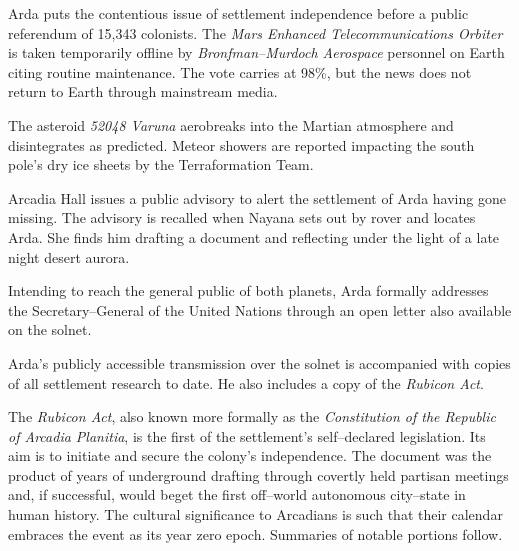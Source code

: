 Arda puts the contentious issue of settlement independence before a public referendum of 15,343 colonists. The {\it Mars Enhanced Telecommunications Orbiter} is taken temporarily offline by {\it Bronfman--Murdoch Aerospace} personnel on Earth citing routine maintenance. The vote carries at 98\%, but the news does not return to Earth through mainstream media.
\StopTimelineDate

The asteroid {\it 52048 Varuna} aerobreaks into the Martian atmosphere and disintegrates as predicted. Meteor showers are reported impacting the south pole's dry ice sheets by the Terraformation Team.
\StopTimelineDate

Arcadia Hall issues a public advisory to alert the settlement of Arda having gone missing. The advisory is recalled when Nayana sets out by rover and locates Arda. She finds him drafting a document and reflecting under the light of a late night desert aurora.
\StopTimelineDate


Intending to reach the general public of both planets, Arda formally addresses the Secretary--General of the United Nations through an open letter also available on the solnet.

\startTimelineCorrespondenceDocument
    
\stopTimelineCorrespondenceDocument

Arda's publicly accessible transmission over the solnet is accompanied with copies of all settlement research to date. He also includes a copy of the {\it Rubicon Act}. 

The {\it Rubicon Act}, also known more formally as the {\it Constitution of the Republic of Arcadia Planitia}, is the first of the settlement's self--declared legislation. Its aim is to initiate and secure the colony's independence. The document was the product of years of underground drafting through covertly held partisan meetings and, if successful, would beget the first off--world autonomous city--state in human history. The cultural significance to Arcadians is such that their calendar embraces the event as its year zero epoch. Summaries of notable portions follow.

\startTimelineGeneralDocument
    
\stopTimelineGeneralDocument

